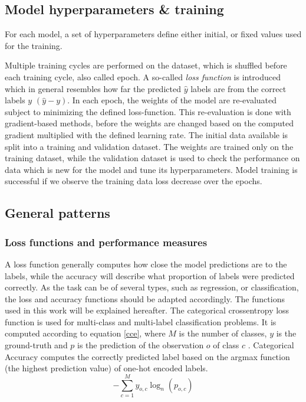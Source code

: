 
\subsection{Model hyperparameters \& training}
For each model, a set of hyperparameters define either initial, or fixed values used for the training. 

Multiple training cycles are performed on the dataset, which is shuffled before each training cycle, also called epoch. A so-called \emph{loss function} is introduced which in general resembles how far the predicted $\hat{y}$ labels are from the correct labels $y$ $(\hat{y} - y)$.
In each epoch, the weights of the model are re-evaluated subject to minimizing the defined loss-function. This re-evaluation is done with gradient-based methods, before the weights are changed based on the computed gradient multiplied with the defined learning rate. The initial data available is split into a training and validation dataset. The weights are trained only on the training dataset, while the validation dataset is used to check the performance on data which is new for the model and tune its hyperparameters. Model training is successful if we observe the training data loss decrease over the epochs. 


\subsection{General patterns}
\subsubsection{Loss functions and performance measures}
 A loss function generally computes how close the model predictions are to the labels, while the accuracy will describe what proportion of labels were predicted correctly. As the task can be of several types, such as regression, or classification, the loss and accuracy functions should be adapted accordingly. The functions used in this work will be explained hereafter.
The categorical crossentropy loss function is used for multi-class and multi-label classification problems. It is computed according to equation \ref{cce}, where $M$ is the number of classes, $y$ is the ground-truth and $p$ is the prediction of the observation $o$ of class $c$ \cite{noauthor_classical_nodate}. 
Categorical Accuracy computes the correctly predicted label based on the argmax function (the highest prediction value) of one-hot encoded labels.
\begin{equation}
\label{cce}
-\sum_{c=1}^My_{o,c}\log_{n}(p_{o,c})
\end{equation}

